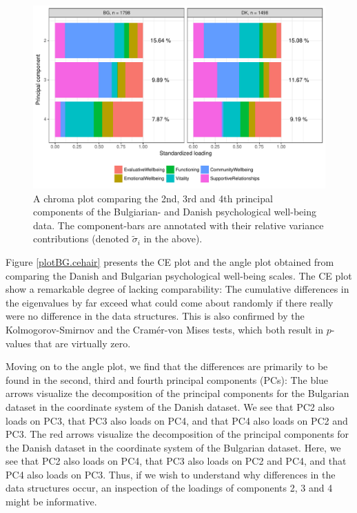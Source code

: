 \documentclass[titlepage,11pt,twoside]{article}
\newcommand{\hl}[1]{\textcolor{magenta}{#1}}
\begin{document}
{\begin{figure}
\center
\includegraphics[scale = 0.7]{essDKBGpancake234.pdf}
\caption{A chroma plot comparing the 2nd, 3rd and 4th principal components of the Bulgiarian- and Danish psychological well-being data. The component-bars are annotated with their relative variance contributions (denoted $\tilde\sigma_i$ in the above).}
\label{plotBG.pancake}
\end{figure}




Figure \ref{plotBG.cehair} presents the CE plot and the angle plot obtained from comparing the Danish and Bulgarian psychological well-being scales. The CE plot show a remarkable degree of lacking comparability: The cumulative differences in the eigenvalues by far exceed what could come about randomly if there really were no difference in the data structures. This is also confirmed by the Kolmogorov-Smirnov and the Cram\'er-von Mises tests, which both result in $p$-values that are virtually zero.

Moving on to the angle plot, we find that the differences are primarily to be found in the second, third and fourth principal components (PCs): The blue arrows visualize the decomposition of the principal components for the Bulgarian dataset in the coordinate system of the Danish dataset. We see that PC2 also loads on PC3, that PC3 also loads on PC4, and that PC4 also loads on PC2 and PC3. The red arrows visualize the decomposition of the principal components for the Danish dataset in the coordinate system of the Bulgarian dataset. Here, we see that PC2 also loads on PC4, that PC3 also loads on PC2 and PC4, and that PC4 also loads on PC3. Thus, if we wish to understand why differences in the data structures occur, an inspection of the loadings of components 2, 3 and 4 might be informative.

}
\end{document}
